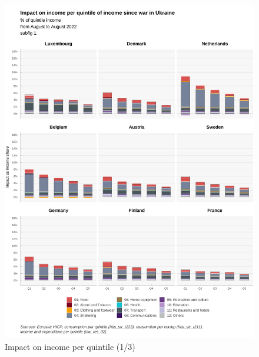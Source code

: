 \documentclass[
  9pt,
  a4paper,
  numbers=noendperiod,
  DIV=12]{scrartcl}
\begin{document}
\begin{figure}

\caption{Impact on income per quintile (1/3)}

{\centering \includegraphics{../svg/coicop_l1_1y_1.png}

}

\end{figure}
\end{document}
